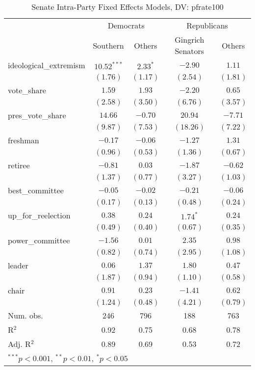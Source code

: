 \documentclass[12pt]{article}
\begin{document}
\begin{table}[H]
	\begin{center}
		\caption{Senate Intra-Party Fixed Effects Models, DV: pfrate100}
		\begin{tabular}{l c c c c }
			\hline
			& \multicolumn{2}{c}{Democrats} & \multicolumn{2}{c}{Republicans} \\
			\cline{2-5}
			& Southern & Others & Gingrich Senators & Others \\
			\hline
			ideological\_extremism  & $10.52^{***}$ & $2.33^{*}$ & $-2.90$    & $1.11$   \\
			& $(1.76)$      & $(1.17)$   & $(2.54)$   & $(1.81)$ \\
			vote\_share             & $1.59$        & $1.93$     & $-2.20$    & $0.65$   \\
			& $(2.58)$      & $(3.50)$   & $(6.76)$   & $(3.57)$ \\
			pres\_vote\_share       & $14.66$       & $-0.70$    & $20.94$    & $-7.71$  \\
			& $(9.87)$      & $(7.53)$   & $(18.26)$  & $(7.22)$ \\
			freshman                & $-0.17$       & $-0.06$    & $-1.27$    & $1.31$   \\
			& $(0.96)$      & $(0.53)$   & $(1.36)$   & $(0.67)$ \\
			retiree                 & $-0.81$       & $0.03$     & $-1.87$    & $-0.62$  \\
			& $(1.37)$      & $(0.77)$   & $(3.27)$   & $(1.03)$ \\
			best\_committee         & $-0.05$       & $-0.02$    & $-0.21$    & $-0.06$  \\
			& $(0.17)$      & $(0.13)$   & $(0.48)$   & $(0.24)$ \\
			up\_for\_reelection     & $0.38$        & $0.24$     & $1.74^{*}$ & $0.24$   \\
			& $(0.49)$      & $(0.40)$   & $(0.67)$   & $(0.35)$ \\
			power\_committee        & $-1.56$       & $0.01$     & $2.35$     & $0.98$   \\
			& $(0.82)$      & $(0.74)$   & $(2.95)$   & $(1.08)$ \\
			leader                  & $0.06$        & $1.37$     & $1.80$     & $0.47$   \\
			& $(1.87)$      & $(0.94)$   & $(1.10)$   & $(0.58)$ \\
			chair                   & $0.91$        & $0.23$     & $-1.41$    & $0.62$   \\
			& $(1.24)$      & $(0.48)$   & $(4.21)$   & $(0.79)$ \\
			\hline
			Num. obs.               & 246           & 796        & 188        & 763      \\
			R$^2$      & 0.92          & 0.75       & 0.68       & 0.78     \\
			Adj. R$^2$ & 0.89          & 0.69       & 0.53       & 0.72     \\
			\hline
			\multicolumn{5}{l}{\scriptsize{$^{***}p<0.001$, $^{**}p<0.01$, $^*p<0.05$}}
		\end{tabular}
	\end{center}
\end{table}
\end{document}
